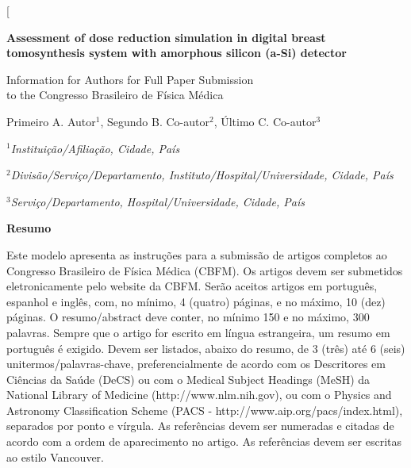 \documentclass[10pt,twoside,twocolumn]{article}
\begin{document}
\twocolumn[
  \begin{@twocolumnfalse}
  
    \begin{flushright}

        \Large{
        \textbf{Assessment of dose reduction simulation in digital breast tomosynthesis system with amorphous silicon (a-Si) detector}
        }
        
        \large{
        Information for Authors for Full Paper Submission\\
        to the Congresso Brasileiro de F\'{i}sica M\'{e}dica
        }
        
        \vspace{\baselineskip}
        
        Primeiro A. Autor$^{1}$, Segundo B. Co-autor$^{2}$, \'{U}ltimo C. Co-autor$^{3}$\\
        
       \vspace{\baselineskip}
       
       \normalsize{
        
        $^{1}$\textit{Institui\c{c}\~{a}o/Afilia\c{c}\~{a}o, Cidade, Pa\'{i}s}
        
        $^{2}$\textit{Divis\~{a}o/Servi\c{c}o/Departamento, Instituto/Hospital/Universidade, Cidade, Pa\'{i}s}
        
        $^{3}$\textit{Servi\c{c}o/Departamento, Hospital/Universidade, Cidade, Pa\'{i}s}
        
        }

    \end{flushright}



\textbf{Resumo}

Este modelo apresenta as instruções para a submissão de artigos completos ao Congresso Brasileiro de Física Médica (CBFM). Os artigos devem ser submetidos eletronicamente pelo website da CBFM. Serão aceitos artigos em português, espanhol e inglês, com, no mínimo, 4 (quatro) páginas, e no máximo, 10 (dez) páginas. O resumo/abstract deve conter, no mínimo 150 e no máximo, 300 palavras. Sempre que o artigo for escrito em língua estrangeira, um resumo em português é exigido. Devem ser listados, abaixo do resumo, de 3 (três) até 6 (seis) unitermos/palavras-chave, preferencialmente de acordo com os Descritores em Ciências da Saúde (DeCS) ou com o Medical Subject Headings (MeSH) da National Library of Medicine (http://www.nlm.nih.gov), ou com o Physics and Astronomy Classification Scheme (PACS - http://www.aip.org/pacs/index.html), separados por ponto e vírgula. As referências devem ser numeradas e citadas de acordo com a ordem de aparecimento no artigo. As referências devem ser escritas ao estilo Vancouver.


\end{@twocolumnfalse}
\end{document}

